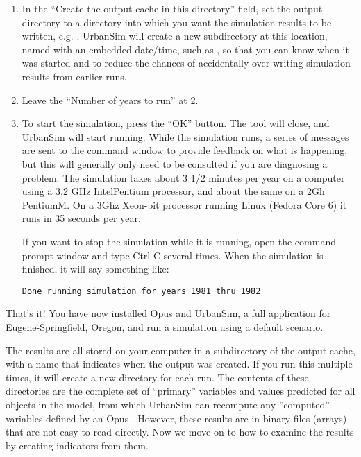 \documentclass{howto}
\begin{document}
\begin{enumerate}
\item In the ``Create the output cache in this directory'' field, set the
output directory to a directory into which you want the simulation results to be
written, e.g. . UrbanSim will
create a new subdirectory at this location, named with an embedded date/time, such as
, so that you can know when it was
started and to reduce the chances of accidentally over-writing
simulation results from earlier runs.

\item Leave the ``Number of years to run'' at 2.

\item To start the simulation, press the ``OK'' button.  The tool will
close, and UrbanSim will start running. While the simulation runs, a
series of messages are sent to the command window to provide
feedback on what is happening, but this will generally only need to
be consulted if you are diagnosing a problem. The simulation takes
about 3 1/2 minutes per year on a computer using a 3.2 GHz
Intel\textregistered Pentium processor, and about
the same on a 2Gh Pentium\textregistered M.  On a 3Ghz
Xeon-bit processor running Linux (Fedora Core 6)
it runs in 35 seconds per year.

If you want to stop the simulation while it is running, open the
command prompt window and type Ctrl-C several times. When the
simulation is finished, it will say something like:

\begin{verbatim}
Done running simulation for years 1981 thru 1982
\end{verbatim}

\end{enumerate}

That's it!  You have now installed Opus and UrbanSim, a full
application for Eugene-Springfield, Oregon, and run a simulation
using a default scenario.

The results are all stored on your computer in a subdirectory of the
output cache, with a name that indicates when the output was
created. If you run this multiple times, it will create a new
directory for each run.  The contents of these directories are the
complete set of ``primary'' variables and values predicted for all objects in
the model, from which UrbanSim can recompute any ''computed'' variables defined
by an Opus .  However, these results are in binary files (arrays) that
are not easy to read directly.  Now we move on to how to examine the results by
creating indicators from them.
\end{document}
